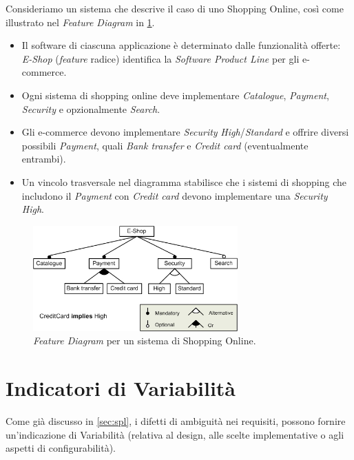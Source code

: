 \documentclass[12pt]{report}
\begin{document}
\begin{mdframed}
\small
Consideriamo un sistema che descrive il caso di uno \textsf{Shopping Online}, così come illustrato nel \textit{Feature Diagram} in \cref{fig:diagramma}.

\begin{itemize}
\item Il software di ciascuna applicazione è determinato dalle funzionalità offerte: \textit{E-Shop} (\textit{feature} radice) identifica la \textit{Software Product Line} per gli e-commerce.
\item Ogni sistema di shopping online deve implementare \textit{Catalogue}, \textit{Payment}, \textit{Security} e opzionalmente \textit{Search}.
\item Gli e-commerce devono implementare \textit{Security} \textit{High}/\textit{Standard} e offrire diversi possibili \textit{Payment}, quali \textit{Bank transfer} e \textit{Credit card} (eventualmente entrambi).
\item Un vincolo trasversale nel diagramma stabilisce che i sistemi di shopping che includono il \textit{Payment} con \textit{Credit card} devono implementare una \textit{Security} \textit{High}.
\end{itemize}

\begin{figure}[H]
\centering
\includegraphics[width=0.7\textwidth]{diagramma.png}
\caption{\textit{Feature Diagram} per un sistema di Shopping Online.}
\label{fig:diagramma}
\end{figure}
\end{mdframed}


\section{Indicatori di Variabilità}  %
\label{sec:indicatori}
Come già discusso in \cref{sec:spl}, i difetti di ambiguità nei requisiti, possono fornire un'indicazione di Variabilità (relativa al design, alle scelte implementative o agli aspetti di configurabilità).
\end{document}
